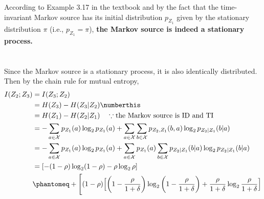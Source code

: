 \documentclass[
  coursecode={MTHE 474},
  assignmentname={Homework \homeworknumber},
  studentnumber=20053722,
  name={Bryan Hoang},
  draft,
]{
  ltxanswer%
}
\begin{document}
\begin{questions}
\begin{parts}
\begin{solution}
        According to Example 3.17 in the textbook and by the fact that the time-invariant Markov source has its initial distribution \(p_{Z_{1}}\) given by the stationary distribution \(\pi\) (i.e., \(p_{Z_{1}}=\pi\)), \textbf{the Markov source is indeed a stationary process.}
      \end{solution}

      \part{}
      \begin{solution}
        Since the Markov source is a stationary process, it is also identically distributed. Then by the chain rule for mutual entropy,
        \begin{align*}
          I(Z_{2};Z_{3}) &= I(Z_{3};Z_{2})                                                                                                                                                                                      \\
                         &= H(Z_{3}) - H(Z_{3}|Z_{2})\numberthis\label{eq:mutual-information-chain-rule}                                                                                                                        \\
                         &= H(Z_{1}) - H(Z_{2}|Z_{1})\quad \because \text{the Markov source is ID and TI}                                                                                                                       \\
                         &= -\sum_{a\in\mathcal{X}} p_{Z_{1}}(a)\log_{2}p_{Z_{1}}(a) + \sum_{a\in\mathcal{X}}\sum_{b\in\mathcal{X}} p_{Z_{2},Z_{1}}(b,a)\log_{2}p_{Z_{2}|Z_{1}}(b|a)                                            \\
                         &= -\sum_{a\in\mathcal{X}} p_{Z_{1}}(a)\log_{2}p_{Z_{1}}(a) + \sum_{a\in\mathcal{X}}p_{Z_{1}}(a)\sum_{b\in\mathcal{X}} p_{Z_{2}|Z_{1}}(b|a)\log_{2}p_{Z_{2}|Z_{1}}(b|a)                                \\
                         &= [-(1-\rho)\log_{2}(1-\rho)-\rho\log_{2}\rho]                                                                                                                                                        \\
                         &\phantomeq + \Biggl[(1-\rho)\Bigl[\left(1-\frac{\rho}{1+\delta}\right)\log_{2}\left(1-\frac{\rho}{1+\delta}\right) + \frac{\rho}{1+\delta}\log_{2}\frac{\rho}{1+\delta}\Bigr]                         \\

\end{align*}
\end{solution}
\end{parts}
\end{questions}
\end{document}
